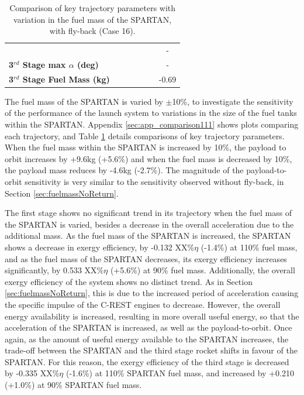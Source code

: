 \begin{table}[ht]
\begin{tabular}{l c c c c c c}
	& \thirdqOverFivemFuelNinety
	& \thirdqOverFivemFuelNinetyFive
	& \thirdqOverFivemFuelStandard
	& \thirdqOverFivemFuelOneHundredFive
	& \thirdqOverFivemFuelOneHundredTen
	& -
	\\
	\textbf{3$^{rd}$ Stage max $\alpha$ (deg)}
	& \thirdmaxAoAmFuelNinety
	& \thirdmaxAoAmFuelNinetyFive
	& \thirdmaxAoAmFuelStandard
	& \thirdmaxAoAmFuelOneHundredFive
	& \thirdmaxAoAmFuelOneHundredTen
	& -
	\\
	\textbf{3$^{rd}$ Stage Fuel Mass (kg)}
	& \thirdmFuelmFuelNinety
	& \thirdmFuelmFuelNinetyFive
	& \thirdmFuelmFuelStandard
	& \thirdmFuelmFuelOneHundredFive
	& \thirdmFuelmFuelOneHundredTen
	&-0.69
	\\
	\hline 
\end{tabular} 
\caption{Comparison of key trajectory parameters with variation in the fuel mass of the SPARTAN, with fly-back (Case 16).}
\label{tab:comparison111}
\end{table}
	
The fuel mass of the SPARTAN is varied by $\pm$10\%, to investigate the sensitivity of the performance of the launch system to variations in the size of the fuel tanks within the SPARTAN. 
Appendix \ref{sec:app_comparison111} shows plots comparing each trajectory, and Table \ref{tab:comparison111} details comparisons of key trajectory parameters. 
When the fuel mass within the SPARTAN is increased by 10\%, the payload to orbit increases by +9.6kg (+5.6\%) and when the fuel mass is decreased by 10\%, the payload mass reduces by -4.6kg (-2.7\%). The magnitude of the payload-to-orbit sensitivity is very similar to the sensitivity observed without fly-back, in Section \ref{sec:fuelmassNoReturn}. 

The first stage shows no significant trend in its trajectory when the fuel mass of the SPARTAN is varied, besides a decrease in the overall acceleration due to the additional mass. 
As the fuel mass of the SPARTAN is increased, the SPARTAN shows a decrease in exergy efficiency, by -0.132 XX\%$\eta$ (-1.4\%) at 110\% fuel mass, and as the fuel mass of the SPARTAN decreases, its exergy efficiency increases significantly, by 0.533 XX\%$\eta$ (+5.6\%) at 90\% fuel mass. Additionally, the overall exergy efficiency of the system shows no distinct trend. 
As in Section \ref{sec:fuelmassNoReturn}, this is due to the increased period of acceleration causing the specific impulse of the C-REST engines to decrease. However, the overall energy availability is increased, resulting in more overall useful energy, so that the acceleration of the SPARTAN is increased, as well as the payload-to-orbit.
Once again, as the amount of useful energy available to the SPARTAN increases, the trade-off between the SPARTAN and the third stage rocket shifts in favour of the SPARTAN. For this reason, the exergy efficiency of the third stage is decreased by -0.335 XX\%$\eta$ (-1.6\%) at 110\% SPARTAN fuel mass, and increased by +0.210 (+1.0\%) at 90\% SPARTAN fuel mass. 



